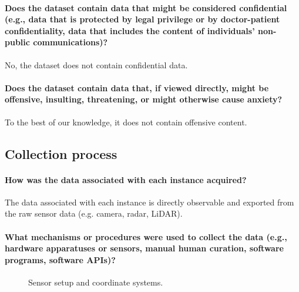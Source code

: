 \documentclass{article}
\begin{document}
\paragraph{Does the dataset contain data that might be considered confidential (e.g., data that is protected by legal privilege or by doctor-patient confidentiality, data that includes the content of individuals’ non-public communications)?} No, the dataset does not contain confidential data.

\paragraph{Does the dataset contain data that, if viewed directly, might be offensive, insulting, threatening, or might otherwise cause anxiety?} To the best of our knowledge, it does not contain offensive content. 


\subsection{Collection process}
\paragraph{How was the data associated with each instance acquired?} The data associated with each instance is directly observable and exported from the raw sensor data (e.g. camera, radar, LiDAR).

\paragraph{What mechanisms or procedures were used to collect the data (e.g., hardware apparatuses or sensors, manual human curation, software programs, software APIs)?} 
\begin{figure}
\begin{floatrow}
{\caption{Sensor setup and coordinate systems.}\label{fig:sensor_setup2}
}

\end{floatrow}
\end{figure}
\end{document}
